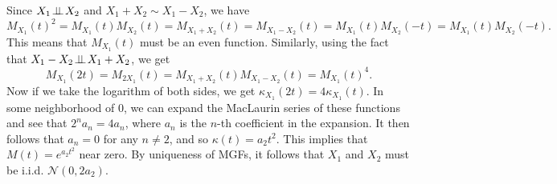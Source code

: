 \documentclass{pset}
\begin{document}
\begin{solution}
  Since $X_1\!\perp\!\!\!\perp\! X_2$ and $X_1+X_2\sim X_1 - X_2$, we have
  \[
    M_{X_1}(t)^2 = M_{X_1}(t)M_{X_2}(t) = M_{X_1+X_2}(t) = M_{X_1-X_2}(t) = M_{X_1}(t)M_{X_2}(-t) = M_{X_1}(t)M_{X_2}(-t).
  \]
  This means that $M_{X_1}(t)$ must be an even function. Similarly, using the fact that $X_1-X_2\!\perp\!\!\!\perp\! X_1+X_2$, we get
  \[
    M_{X_1}(2t) = M_{2X_1}(t) = M_{X_1+X_2}(t)M_{X_1-X_2}(t) = M_{X_1}(t)^4.
  \]
  Now if we take the logarithm of both sides, we get $\kappa_{X_1}(2t) = 4\kappa_{X_1}(t)$. In some neighborhood of $0$, we can expand the MacLaurin series of these functions and see that $2^na_n = 4a_n$, where $a_n$ is the $n$-th coefficient in the expansion. It then follows that $a_n=0$ for any $n\neq 2$, and so $\kappa(t)=a_2t^2$. This implies that $M(t)=e^{a_2 t^2}$ near zero. By uniqueness of MGFs, it follows that $X_1$ and $X_2$ must be i.i.d. $\mathcal{N}(0, 2a_2)$.
\end{solution}
\end{document}
